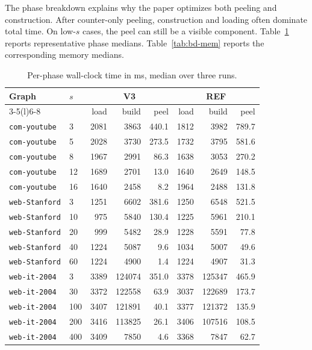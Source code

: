 The phase breakdown explains why the paper optimizes both peeling and construction.
%
After counter-only peeling, construction and loading often dominate total time.
%
On low-\(s\) cases, the peel can still be a visible component.
%
Table~\ref{tab:bd-time} reports representative phase medians.
%
Table~\ref{tab:bd-mem} reports the corresponding memory medians.
%

\begin{table}[t]
\centering
\caption{Per-phase wall-clock time in ms, median over three runs.}
\label{tab:bd-time}
\scriptsize
\begin{tabular}{llrrrrrr}
\toprule
\multirow{2}{*}{Graph} & \multirow{2}{*}{\(s\)} & \multicolumn{3}{c}{V3} & \multicolumn{3}{c}{REF} \\
\cmidrule(l){3-5}\cmidrule(l){6-8}
& & load & build & peel & load & build & peel \\
\midrule
\texttt{com-youtube}  & 3  & 2081 & 3863 & 440.1 & 1812 & 3982 & 789.7 \\
\texttt{com-youtube}  & 5  & 2028 & 3730 & 273.5 & 1732 & 3795 & 581.6 \\
\texttt{com-youtube}  & 8  & 1967 & 2991 & 86.3  & 1638 & 3053 & 270.2 \\
\texttt{com-youtube}  & 12 & 1689 & 2701 & 13.0  & 1640 & 2649 & 148.5 \\
\texttt{com-youtube}  & 16 & 1640 & 2458 & 8.2   & 1964 & 2488 & 131.8 \\
\midrule
\texttt{web-Stanford} & 3  & 1251 & 6602 & 381.6 & 1250 & 6548 & 521.5 \\
\texttt{web-Stanford} & 10 & 975  & 5840 & 130.4 & 1225 & 5961 & 210.1 \\
\texttt{web-Stanford} & 20 & 999  & 5482 & 28.9  & 1228 & 5591 & 77.8 \\
\texttt{web-Stanford} & 40 & 1224 & 5087 & 9.6   & 1034 & 5007 & 49.6 \\
\texttt{web-Stanford} & 60 & 1224 & 4900 & 1.4   & 1224 & 4907 & 31.3 \\
\midrule
\texttt{web-it-2004}  & 3   & 3389 & 124074 & 351.0 & 3378 & 125347 & 465.9 \\
\texttt{web-it-2004}  & 30  & 3372 & 122558 & 63.9  & 3037 & 122689 & 173.7 \\
\texttt{web-it-2004}  & 100 & 3407 & 121891 & 40.1  & 3377 & 121372 & 135.9 \\
\texttt{web-it-2004}  & 200 & 3416 & 113825 & 26.1  & 3406 & 107516 & 108.5 \\
\texttt{web-it-2004}  & 400 & 3409 & 7850   & 4.6   & 3368 & 7847   & 62.7 \\
\bottomrule
\end{tabular}
\end{table}

